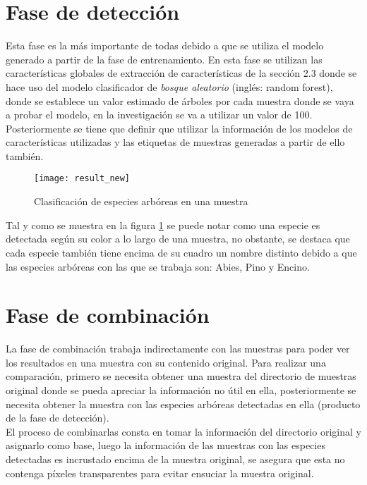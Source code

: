 \section{Fase de detección}
Esta fase es la más importante de todas debido a que se utiliza el modelo generado a partir de la fase de entrenamiento. En esta fase se utilizan las características globales de extracción de características de la sección 2.3 donde se hace uso del modelo clasificador de {\em bosque aleatorio} (inglés: random forest)\footnotemark, donde se establece un valor estimado de árboles por cada muestra donde se vaya a probar el modelo, en la investigación se va a utilizar un valor de 100. Posteriormente se tiene que definir que utilizar la información de los modelos de características utilizadas y las etiquetas de muestras generadas a partir de ello también. 
\\

\begin{figure}[H]
  \centering
         \texttt{[image: result\_new]}
    \caption{Clasificación de especies arbóreas en una muestra}
    \label{Clasificación de especies arbóreas en una muestra}
\end{figure}

Tal y como se muestra en la figura \ref{Clasificación de especies arbóreas en una muestra}  se puede notar como una especie es detectada según su color a lo largo de una muestra, no obstante, se destaca que cada especie también tiene encima de su cuadro un nombre distinto debido a que las especies arbóreas con las que se trabaja son: Abies, Pino y Encino. 

\section{Fase de combinación}
La fase de combinación trabaja indirectamente con las muestras para poder ver los resultados en una muestra con su contenido original. Para realizar una comparación, primero se necesita obtener una muestra del directorio de muestras original donde se pueda apreciar la información no útil en ella, posteriormente se necesita obtener la muestra con las especies arbóreas detectadas en ella (producto de la fase de detección).\\ 

El proceso de combinarlas consta en tomar la información del directorio original y asignarlo como base, luego la información de las muestras con las especies detectadas es incrustado encima de la muestra original, se asegura que esta no contenga píxeles transparentes para evitar ensuciar la muestra original.


